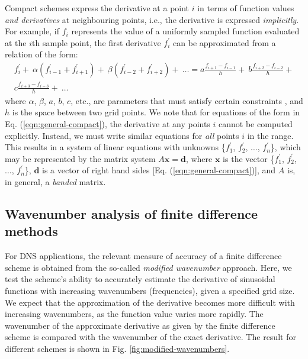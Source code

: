 Compact schemes express the derivative at a point $i$
in terms of
function values \emph{and derivatives}
at neighbouring points,
i.e., the derivative is expressed \emph{implicitly}.
For example,
if $f_i$ represents the value of
a uniformly sampled function evaluated at the $i$th sample point,
the first derivative $f^{\prime}_i$ can be approximated from
a relation of the form:
%
\begin{equation}
\begin{split}
    f_i^{\prime} + \
    \alpha(f^{\prime}_{i-1} + f^{\prime}_{i+1}) + \
    \beta(f^{\prime}_{i-2} + f^{\prime}_{i+2}) + \
    \hdots
    = 
    a\frac{f_{i+1} - f_{i-1}}{h} + \
    b\frac{f_{i+2} - f_{i-2}}{h} + \\
    c\frac{f_{i+3} - f_{i-3}}{h} + \
    \hdots
\end{split}
\label{eqn:general-compact}
\end{equation}
%
where $\alpha$, $\beta$, $a$, $b$, $c$, etc.,
are parameters that must satisfy certain constraints \cite{kennedy1994several,lele1992compact},
and $h$ is the space between two grid points.
We note that for equations of the form in Eq. (\ref{eqn:general-compact}),
the derivative at any points $i$ cannot be computed explicitly.
Instead, we must write similar equations for \emph{all} points $i$
in the range.
This results in a system of linear equations
with unknowns \{$f^{\prime}_1$, $f^{\prime}_2$, $\hdots$, $f^{\prime}_n$\},
which may be represented by the matrix system $A\bm{x}=\bm{d}$,
where $\bm{x}$ is the vector
\{$f^{\prime}_1$, $f^{\prime}_2$, $\hdots$, $f^{\prime}_n$\},
$\bm{d}$ is a vector of right hand sides [Eq. (\ref{eqn:general-compact})],
and $A$ is, in general, a \emph{banded} matrix.

\subsection{Wavenumber analysis of finite difference methods}
\label{subsec:wavenumber-analysis}

For DNS applications, the relevant measure of accuracy of a
finite difference scheme is obtained from the so-called
\emph{modified wavenumber} approach.
Here, we test the scheme's ability to
accurately estimate the derivative of sinusoidal functions
with increasing wavenumbers (frequencies),
given a specified grid size. 
We expect that the approximation of the derivative
becomes more difficult with increasing wavenumbers,
as the function value varies more rapidly.
The wavenumber of the approximate derivative
as given by the finite difference scheme is compared with
the wavenumber of the exact derivative.
The result for different schemes is shown
in Fig. \ref{fig:modified-wavenumbers}.

